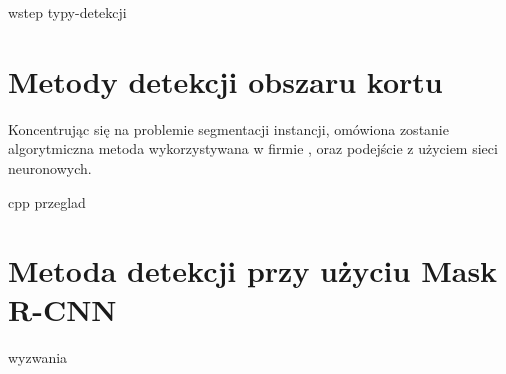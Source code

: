 {wstep}
{typy-detekcji}

\section{Metody detekcji obszaru kortu}
\label{sec:metody_detekcji}

Koncentrując się na problemie segmentacji instancji, omówiona zostanie algorytmiczna metoda wykorzystywana w firmie \blue{}, oraz podejście z użyciem sieci neuronowych. \\


{cpp}
{przeglad}

\section{Metoda detekcji przy użyciu Mask R-CNN}
{wyzwania}
